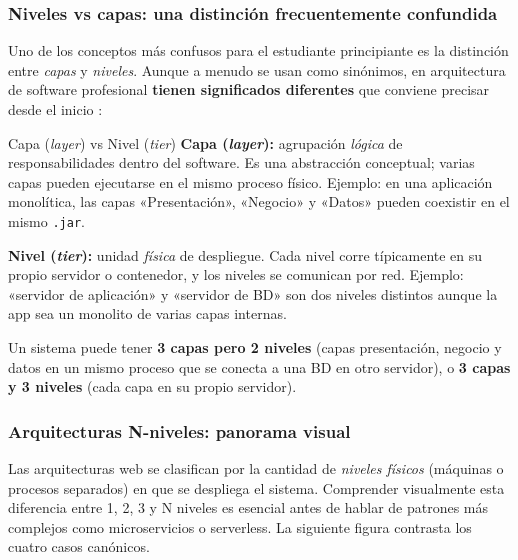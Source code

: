 \documentclass[11pt,a4paper,openany]{book}
\begin{document}
\subsubsection{Niveles vs capas: una distinción frecuentemente confundida}

Uno de los conceptos más confusos para el estudiante principiante es
la distinción entre \emph{capas} y \emph{niveles}. Aunque a menudo se
usan como sinónimos, en arquitectura de software profesional
\textbf{tienen significados diferentes} que conviene precisar desde el
inicio \cite{fowler2002patterns,richards2020fundamentals}:

\begin{cajadefinicion}{Capa (\emph{layer}) vs Nivel (\emph{tier})}
\textbf{Capa (\emph{layer}):} agrupación \emph{lógica} de
responsabilidades dentro del software. Es una abstracción
conceptual; varias capas pueden ejecutarse en el mismo proceso físico.
Ejemplo: en una aplicación monolítica, las capas «Presentación»,
«Negocio» y «Datos» pueden coexistir en el mismo \texttt{.jar}.

\textbf{Nivel (\emph{tier}):} unidad \emph{física} de despliegue. Cada
nivel corre típicamente en su propio servidor o contenedor, y los
niveles se comunican por red. Ejemplo: «servidor de aplicación» y
«servidor de BD» son dos niveles distintos aunque la app sea un
monolito de varias capas internas.

Un sistema puede tener \textbf{3 capas pero 2 niveles} (capas
presentación, negocio y datos en un mismo proceso que se conecta a una
BD en otro servidor), o \textbf{3 capas y 3 niveles} (cada capa en su
propio servidor).
\end{cajadefinicion}

\subsubsection{Arquitecturas N-niveles: panorama visual}

Las arquitecturas web se clasifican por la cantidad de
\emph{niveles físicos} (máquinas o procesos separados) en que se
despliega el sistema. Comprender visualmente esta diferencia entre
1, 2, 3 y N niveles es esencial antes de hablar de patrones más
complejos como microservicios o serverless. La siguiente figura
contrasta los cuatro casos canónicos.
\end{document}

